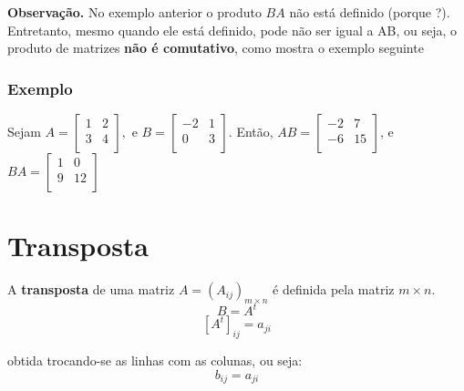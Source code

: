 \documentclass{article}
\begin{document}
\noindent\makebox[\linewidth]{\rule{\paperwidth}{0.8pt}}
\textbf{Observação.} No exemplo anterior o produto $BA$ não está definido (porque ?). Entretanto, mesmo quando ele está definido,
    pode não ser igual a AB, ou seja, o produto de matrizes \textbf{não é comutativo}, como mostra o exemplo seguinte
    \newline
    \noindent\makebox[\linewidth]{\rule{\paperwidth}{0.8pt}}


\subsubsection{Exemplo}
Sejam $
    A = 
    \begin{bmatrix}
        1 & 2 \\
        3 & 4 \\
    \end{bmatrix},$ e $
    B = 
    \begin{bmatrix}
        -2 & 1 \\
        0 & 3 \\
    \end{bmatrix}.
    $ Então, $
    AB =
    \begin{bmatrix}
        -2 & 7 \\
        -6 & 15 \\
    \end{bmatrix} 
    $, e $
    BA = 
    \begin{bmatrix}
        1 & 0 \\
        9 & 12 \\
    \end{bmatrix} 
    $

\section{Transposta}
    A \textbf{transposta} de uma matriz $A = (A_{ij})_{m \times n}$ é definida pela matriz $m \times n$.
    $$B = A^t$$ 
    $$[A^t]_{ij} = a_{ji}$$

    obtida trocando-se as linhas com as colunas, ou seja:
    $$b_{ij} = a_{ji}$$
\end{document}
